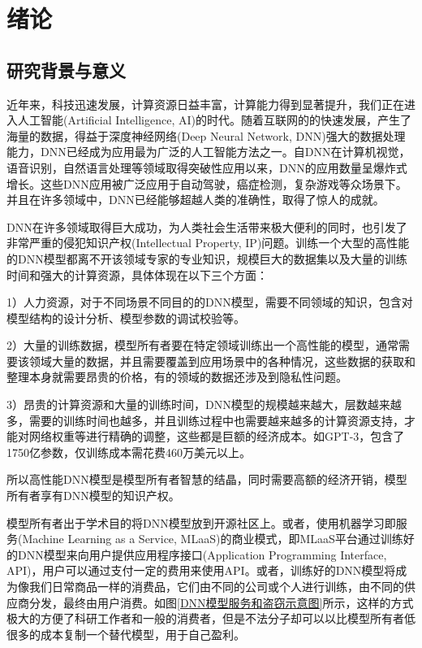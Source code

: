 
\chapter{绪论}
\label{1}


\section{研究背景与意义}

近年来，科技迅速发展，计算资源日益丰富，计算能力得到显著提升，我们正在进入人工智能(Artificial Intelligence, AI)\cite{winston1984artificial}的时代。随着互联网的的快速发展，产生了海量的数据，得益于深度神经网络(Deep Neural Network, DNN)\cite{sze2017efficient}强大的数据处理能力，DNN已经成为应用最为广泛的人工智能方法之一。自DNN在计算机视觉\cite{he2016identity,cortes2015advances,simonyan2014very}，语音识别\cite{nassif2019speech}，自然语言处理\cite{collobert2011natural,wu2016google,xiong2016achieving}等领域取得突破性应用以来，DNN的应用数量呈爆炸式增长。这些DNN应用被广泛应用于自动驾驶\cite{chen2015deepdriving}，癌症检测\cite{esteva2017dermatologist}，复杂游戏\cite{silver2017mastering}等众场景下。并且在许多领域中，DNN已经能够超越人类的准确性，取得了惊人的成就。

DNN在许多领域取得巨大成功，为人类社会生活带来极大便利的同时，也引发了非常严重的侵犯知识产权(Intellectual Property, IP)问题。训练一个大型的高性能的DNN模型都离不开该领域专家的专业知识，规模巨大的数据集以及大量的训练时间和强大的计算资源，具体体现在以下三个方面：

1）人力资源，对于不同场景不同目的的DNN模型，需要不同领域的知识，包含对模型结构的设计分析、模型参数的调试校验等。

2）大量的训练数据，模型所有者要在特定领域训练出一个高性能的模型，通常需要该领域大量的数据，并且需要覆盖到应用场景中的各种情况，这些数据的获取和整理本身就需要昂贵的价格，有的领域的数据还涉及到隐私性问题。

3）昂贵的计算资源和大量的训练时间，DNN模型的规模越来越大，层数越来越多，需要的训练时间也越多，并且训练过程中也需要越来越多的计算资源支持，才能对网络权重等进行精确的调整，这些都是巨额的经济成本。如GPT-3\cite{brown2020language}，包含了1750亿参数，仅训练成本需花费460万美元以上。


所以高性能DNN模型是模型所有者智慧的结晶，同时需要高额的经济开销，模型所有者享有DNN模型的知识产权\cite{chen2018performance,darvish2019deepsigns}。

模型所有者出于学术目的将DNN模型放到开源社区上。或者，使用机器学习即服务(Machine Learning as a Service, MLaaS)\cite{ribeiro2015mlaas}的商业模式，即MLaaS平台通过训练好的DNN模型来向用户提供应用程序接口(Application Programming Interface, API)\cite{ofoeda2019application}，用户可以通过支付一定的费用来使用API。或者，训练好的DNN模型将成为像我们日常商品一样的消费品，它们由不同的公司或个人进行训练，由不同的供应商分发，最终由用户消费。如图\ref{DNN模型服务和盗窃示意图}所示，这样的方式极大的方便了科研工作者和一般的消费者，但是不法分子却可以以比模型所有者低很多的成本复制一个替代模型，用于自己盈利。

